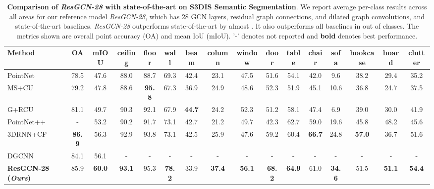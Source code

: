\documentclass[10pt,twocolumn,letterpaper]{article}
\begin{document}
\begin{table*}[!htb]
\centering
\footnotesize 
\setlength{\tabcolsep}{4.2pt} 
\begin{tabular}{lcc|ccccccccccccc}
\toprule
\textbf{Method}  & \textbf{OA} & \textbf{mIOU}    & \textbf{ceiling} & \textbf{floor}   & \textbf{wall}    & \textbf{beam}    & \textbf{column}  & \textbf{window}  & \textbf{door}    & \textbf{table}   & \textbf{chair}   & \textbf{sofa}    & \textbf{bookcase} & \textbf{board}   & \textbf{clutter} \\
\midrule
PointNet \cite{pc_qi2017pointnet}& 78.5    & 47.6    & 88.0    & 88.7    & 69.3    & 42.4    & 23.1    & 47.5    & 51.6    & 54.1    & 42.0    & 9.6     & 38.2    & 29.4    & 35.2    \\
MS+CU \cite{3dsemseg_ICCVW17}   & 79.2    & 47.8    & 88.6    & \textbf{95.8} & 67.3    & 36.9    & 24.9    & 48.6    & 52.3    & 51.9    & 45.1    & 10.6    & 36.8    & 24.7    & 37.5    \\
G+RCU \cite{3dsemseg_ICCVW17}    & 81.1    & 49.7    & 90.3    & 92.1    & 67.9    & \textbf{44.7} & 24.2    & 52.3    & 51.2    & 58.1    & 47.4    & 6.9     & 39.0    & 30.0    & 41.9    \\
PointNet++ \cite {pc_qi2017pointnet++} &-  &53.2 &90.2 &91.7 &73.1 &42.7 &21.2 &49.7 &42.3 &62.7 &59.0 &19.6 &45.8 &48.2 &45.6\\
3DRNN+CF \cite{pc_ye20183d}& \textbf{86.9} & 56.3    & 92.9    & 93.8    & 73.1    & 42.5    & 25.9    & 47.6    & 59.2    & 60.4    & \textbf{66.7} & 24.8    & \textbf{57.0} & 36.7    & 51.6    \\
\midrule
DGCNN \cite{wang2018dynamic}  & 84.1    & 56.1    & - & - & - & - & - & - & - & - & - & - & - & - & - \\
\textbf{ResGCN-28 (\textit{Ours})} & 85.9    & \textbf{60.0} & \textbf{93.1} & 95.3    & \textbf{78.2} & 33.9    & \textbf{37.4} & \textbf{56.1} & \textbf{68.2} & \textbf{64.9} & 61.0  & \textbf{34.6}    & 51.5    & \textbf{51.1} & \textbf{54.4}\\
\bottomrule
\end{tabular}
\vspace{3pt}
\caption{\textbf{Comparison of \emph{ResGCN-28} with state-of-the-art on S3DIS Semantic Segmentation}. We report average per-class results across all areas for our reference model \emph{ResGCN-28}, which has 28 GCN layers, residual graph connections, and dilated graph convolutions, and state-of-the-art baselines. \emph{ResGCN-28} outperforms state-of-the-art by almost . It also outperforms all baselines in  out of  classes. The metrics shown are overall point accuracy (OA) and mean IoU (mIoU). '-' denotes not reported and \textbf{bold} denotes best performance.}
\label{tbl:ours_vs_baselines}
\end{table*}
\end{document}
